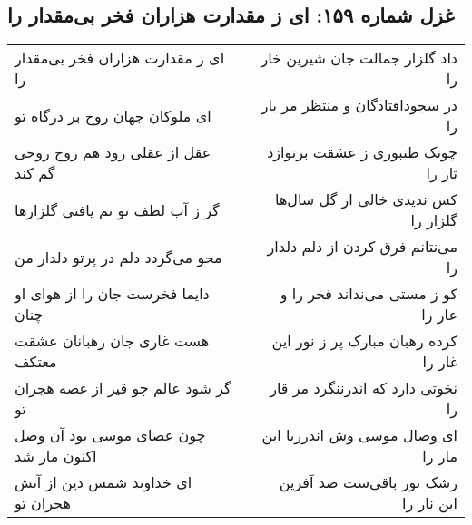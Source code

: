 \begin{center}
\section*{غزل شماره ۱۵۹: ای ز مقدارت هزاران فخر بی‌مقدار را}
\label{sec:0159}
\begin{longtable}{l p{0.5cm} r}
ای ز مقدارت هزاران فخر بی‌مقدار را
&&
داد گلزار جمالت جان شیرین خار را
\\
ای ملوکان جهان روح بر درگاه تو
&&
در سجودافتادگان و منتظر مر بار را
\\
عقل از عقلی رود هم روح روحی گم کند
&&
چونک طنبوری ز عشقت برنوازد تار را
\\
گر ز آب لطف تو نم یافتی گلزارها
&&
کس ندیدی خالی از گل سال‌ها گلزار را
\\
محو می‌گردد دلم در پرتو دلدار من
&&
می‌نتانم فرق کردن از دلم دلدار را
\\
دایما فخرست جان را از هوای او چنان
&&
کو ز مستی می‌نداند فخر را و عار را
\\
هست غاری جان رهبانان عشقت معتکف
&&
کرده رهبان مبارک پر ز نور این غار را
\\
گر شود عالم چو قیر از غصه هجران تو
&&
نخوتی دارد که اندرننگرد مر قار را
\\
چون عصای موسی بود آن وصل اکنون مار شد
&&
ای وصال موسی وش اندرربا این مار را
\\
ای خداوند شمس دین از آتش هجران تو
&&
رشک نور باقی‌ست صد آفرین این نار را
\\
\end{longtable}
\end{center}
